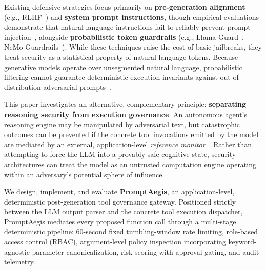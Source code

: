 \documentclass[10pt,twocolumn,letterpaper]{article}
\begin{document}
Existing defensive strategies focus primarily on \textbf{pre-generation alignment} (e.g., RLHF~\cite{ouyang}) and \textbf{system prompt instructions}, though empirical evaluations demonstrate that natural language instructions fail to reliably prevent prompt injection~\cite{perez}, alongside \textbf{probabilistic token guardrails} (e.g., Llama Guard~\cite{llamaguard}, NeMo Guardrails~\cite{nemoguardrails}). While these techniques raise the cost of basic jailbreaks, they treat security as a statistical property of natural language tokens. Because generative models operate over unsegmented natural language, probabilistic filtering cannot guarantee deterministic execution invariants against out-of-distribution adversarial prompts~\cite{zou}.

This paper investigates an alternative, complementary principle: \textbf{separating reasoning security from execution governance}. An autonomous agent's reasoning engine may be manipulated by adversarial text, but catastrophic outcomes can be prevented if the concrete tool invocations emitted by the model are mediated by an external, application-level \emph{reference monitor}~\cite{anderson,schneider}. Rather than attempting to force the LLM into a provably safe cognitive state, security architectures can treat the model as an untrusted computation engine operating within an adversary's potential sphere of influence.

We design, implement, and evaluate \textbf{PromptAegis}, an application-level, deterministic post-generation tool governance gateway. Positioned strictly between the LLM output parser and the concrete tool execution dispatcher, PromptAegis mediates every proposed function call through a multi-stage deterministic pipeline: 60-second fixed tumbling-window rate limiting, role-based access control (RBAC), argument-level policy inspection incorporating keyword-agnostic parameter canonicalization, risk scoring with approval gating, and audit telemetry.
\end{document}

